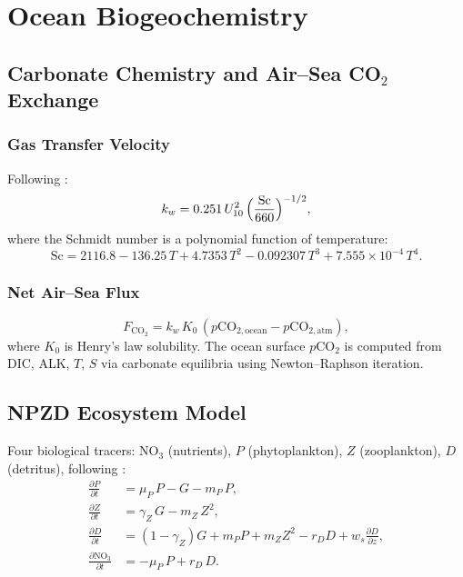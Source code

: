 \documentclass[11pt,twoside]{report}
\newcommand{\pp}{\partial}
\begin{document}
\chapter{Ocean Biogeochemistry}
\label{ch:bgc}

\section{Carbonate Chemistry and Air--Sea CO$_2$ Exchange}

\subsection{Gas Transfer Velocity}

Following \citet{Wanninkhof2014}:
\begin{equation}
  k_w = 0.251\,U_{10}^2\,\Bigl(\frac{\mathrm{Sc}}{660}\Bigr)^{-1/2},
\end{equation}
where the Schmidt number is a polynomial function of temperature:
\begin{equation}
  \mathrm{Sc} = 2116.8 - 136.25\,T + 4.7353\,T^2
  - 0.092307\,T^3 + 7.555\times10^{-4}\,T^4.
\end{equation}

\subsection{Net Air--Sea Flux}
\begin{equation}
  F_{\mathrm{CO}_2} = k_w\,K_0\,
  (p\mathrm{CO}_{2,\mathrm{ocean}} - p\mathrm{CO}_{2,\mathrm{atm}}),
\end{equation}
where $K_0$ is Henry's law solubility.  The ocean surface $p$CO$_2$ is
computed from DIC, ALK, $T$, $S$ via carbonate equilibria using
Newton--Raphson iteration.


\section{NPZD Ecosystem Model}
\label{sec:npzd}

Four biological tracers: NO$_3$ (nutrients), $P$ (phytoplankton),
$Z$ (zooplankton), $D$ (detritus), following \citet{Fasham1990}:
\begin{align}
  \frac{\pp P}{\pp t} &= \mu_P\,P - G - m_P\,P, \\
  \frac{\pp Z}{\pp t} &= \gamma_Z\,G - m_Z\,Z^2, \\
  \frac{\pp D}{\pp t} &= (1-\gamma_Z)G + m_P P + m_Z Z^2
  - r_D D + w_s\frac{\pp D}{\pp z}, \\
  \frac{\pp\mathrm{NO}_3}{\pp t} &= -\mu_P\,P + r_D\,D.
\end{align}
\end{document}
